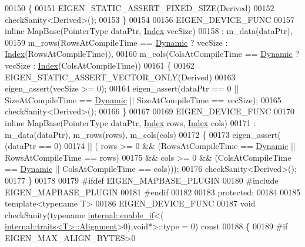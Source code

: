 \begin{DoxyCode}
00150     \{
00151       EIGEN\_STATIC\_ASSERT\_FIXED\_SIZE(Derived)
00152       checkSanity<Derived>();
00153     \}
00154 
00156     EIGEN\_DEVICE\_FUNC
00157     \textcolor{keyword}{inline} MapBase(PointerType dataPtr, \hyperlink{namespace_eigen_a62e77e0933482dafde8fe197d9a2cfde}{Index} vecSize)
00158             : m\_data(dataPtr),
00159               m\_rows(RowsAtCompileTime == \hyperlink{namespace_eigen_ad81fa7195215a0ce30017dfac309f0b2}{Dynamic} ? vecSize : \hyperlink{namespace_eigen_a62e77e0933482dafde8fe197d9a2cfde}{Index}(RowsAtCompileTime)),
00160               m\_cols(ColsAtCompileTime == \hyperlink{namespace_eigen_ad81fa7195215a0ce30017dfac309f0b2}{Dynamic} ? vecSize : \hyperlink{namespace_eigen_a62e77e0933482dafde8fe197d9a2cfde}{Index}(ColsAtCompileTime))
00161     \{
00162       EIGEN\_STATIC\_ASSERT\_VECTOR\_ONLY(Derived)
00163       eigen\_assert(vecSize >= 0);
00164       eigen\_assert(dataPtr == 0 || SizeAtCompileTime == \hyperlink{namespace_eigen_ad81fa7195215a0ce30017dfac309f0b2}{Dynamic} || SizeAtCompileTime == vecSize);
00165       checkSanity<Derived>();
00166     \}
00167 
00169     EIGEN\_DEVICE\_FUNC
00170     \textcolor{keyword}{inline} MapBase(PointerType dataPtr, \hyperlink{namespace_eigen_a62e77e0933482dafde8fe197d9a2cfde}{Index} rows, \hyperlink{namespace_eigen_a62e77e0933482dafde8fe197d9a2cfde}{Index} cols)
00171             : m\_data(dataPtr), m\_rows(rows), m\_cols(cols)
00172     \{
00173       eigen\_assert( (dataPtr == 0)
00174               || (   rows >= 0 && (RowsAtCompileTime == \hyperlink{namespace_eigen_ad81fa7195215a0ce30017dfac309f0b2}{Dynamic} || RowsAtCompileTime == rows)
00175                   && cols >= 0 && (ColsAtCompileTime == \hyperlink{namespace_eigen_ad81fa7195215a0ce30017dfac309f0b2}{Dynamic} || ColsAtCompileTime == cols)));
00176       checkSanity<Derived>();
00177     \}
00178 
00179 \textcolor{preprocessor}{    #ifdef EIGEN\_MAPBASE\_PLUGIN}
00180 \textcolor{preprocessor}{    #include EIGEN\_MAPBASE\_PLUGIN}
00181 \textcolor{preprocessor}{    #endif}
00182 
00183   \textcolor{keyword}{protected}:
00184 
00185     \textcolor{keyword}{template}<\textcolor{keyword}{typename} T>
00186     EIGEN\_DEVICE\_FUNC
00187     \textcolor{keywordtype}{void} checkSanity(\textcolor{keyword}{typename} \hyperlink{struct_eigen_1_1internal_1_1enable__if}{internal::enable\_if}<(
      \hyperlink{struct_eigen_1_1internal_1_1traits}{internal::traits<T>::Alignment}>0),\textcolor{keywordtype}{void}*>::type = 0)\textcolor{keyword}{ const}
00188 \textcolor{keyword}{    }\{
00189 \textcolor{preprocessor}{#if EIGEN\_MAX\_ALIGN\_BYTES>0}

\end{DoxyCode}
